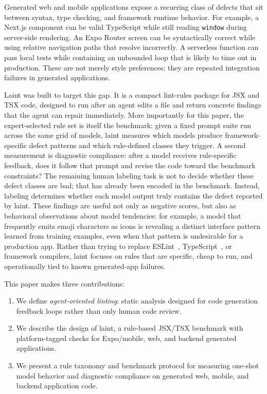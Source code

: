\documentclass[11pt]{article}
\begin{document}
Generated web and mobile applications expose a recurring class of defects that sit between syntax, type checking, and framework runtime behavior. For example, a Next.js component can be valid TypeScript while still reading \texttt{window} during server-side rendering. An Expo Router screen can be syntactically correct while using relative navigation paths that resolve incorrectly. A serverless function can pass local tests while containing an unbounded loop that is likely to time out in production. These are not merely style preferences; they are repeated integration failures in generated applications.

Laint was built to target this gap. It is a compact lint-rules package for JSX and TSX code, designed to run after an agent edits a file and return concrete findings that the agent can repair immediately. More importantly for this paper, the expert-selected rule set is itself the benchmark: given a fixed prompt suite run across the same grid of models, laint measures which models produce framework-specific defect patterns and which rule-defined classes they trigger. A second measurement is diagnostic compliance: after a model receives rule-specific feedback, does it follow that prompt and revise the code toward the benchmark constraints? The remaining human labeling task is not to decide whether these defect classes are bad; that has already been encoded in the benchmark. Instead, labeling determines whether each model output truly contains the defect reported by laint. These findings are useful not only as negative scores, but also as behavioral observations about model tendencies: for example, a model that frequently emits emoji characters as icons is revealing a distinct interface pattern learned from training examples, even when that pattern is undesirable for a production app. Rather than trying to replace ESLint~\cite{eslint}, TypeScript~\cite{typescript}, or framework compilers, laint focuses on rules that are specific, cheap to run, and operationally tied to known generated-app failures.

This paper makes three contributions:

\begin{enumerate}
  \item We define \emph{agent-oriented linting}: static analysis designed for code generation feedback loops rather than only human code review.
  \item We describe the design of laint, a rule-based JSX/TSX benchmark with platform-tagged checks for Expo/mobile, web, and backend generated applications.
  \item We present a rule taxonomy and benchmark protocol for measuring one-shot model behavior and diagnostic compliance on generated web, mobile, and backend application code.
\end{enumerate}
\end{document}
